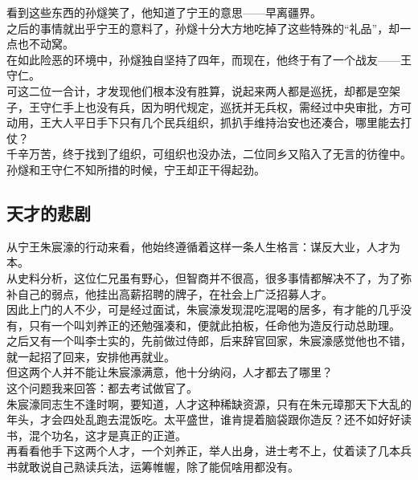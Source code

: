 \begin{multicols}{\theparacolNo}
看到这些东西的孙燧笑了，他知道了宁王的意思——早离疆界。\\

之后的事情就出乎宁王的意料了，孙燧十分大方地吃掉了这些特殊的“礼品”，却一点也不动窝。\\

在如此险恶的环境中，孙燧独自坚持了四年，而现在，他终于有了一个战友——王守仁。\\

可这二位一合计，才发现他们根本没有胜算，说起来两人都是巡抚，却都是空架子，王守仁手上也没有兵，因为明代规定，巡抚并无兵权，需经过中央审批，方可动用，王大人平日手下只有几个民兵组织，抓扒手维持治安也还凑合，哪里能去打仗？\\

千辛万苦，终于找到了组织，可组织也没办法，二位同乡又陷入了无言的彷徨中。\\

孙燧和王守仁不知所措的时候，宁王却正干得起劲。\\

\subsection{天才的悲剧}
从宁王朱宸濠的行动来看，他始终遵循着这样一条人生格言：谋反大业，人才为本。\\

从史料分析，这位仁兄虽有野心，但智商并不很高，很多事情都解决不了，为了弥补自己的弱点，他挂出高薪招聘的牌子，在社会上广泛招募人才。\\

因此上门的人不少，可是经过面试，朱宸濠发现混吃混喝的居多，有才能的几乎没有，只有一个叫刘养正的还勉强凑和，便就此拍板，任命他为造反行动总助理。\\

之后又有一个叫李士实的，先前做过侍郎，后来辞官回家，朱宸濠感觉他也不错，就一起招了回来，安排他再就业。\\

但这两个人并不能让朱宸濠满意，他十分纳闷，人才都去了哪里？\\

这个问题我来回答：都去考试做官了。\\

朱宸濠同志生不逢时啊，要知道，人才这种稀缺资源，只有在朱元璋那天下大乱的年头，才会四处乱跑去混饭吃。太平盛世，谁肯提着脑袋跟你造反？还不如好好读书，混个功名，这才是真正的正道。\\

再看看他手下这两个人才，一个刘养正，举人出身，进士考不上，仗着读了几本兵书就敢说自己熟读兵法，运筹帷幄，除了能侃啥用都没有。\\


\end{multicols}
